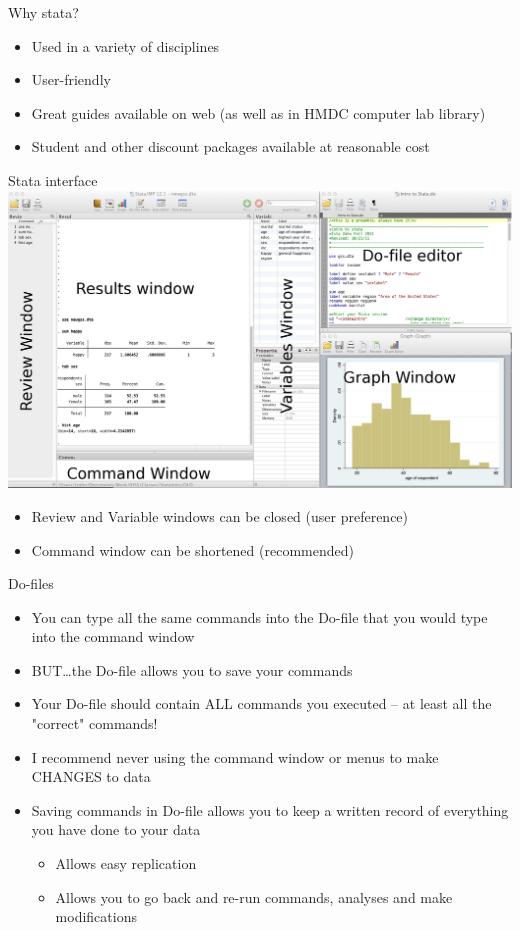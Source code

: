\documentclass[table,smaller]{beamer}
\begin{document}
\begin{frame}[label=sec-1-3]{Why stata?}
\begin{itemize}
\item Used in a variety of disciplines
\item User-friendly
\item Great guides available on web (as well as in HMDC computer lab library)
\item Student and other discount packages available at reasonable cost
\end{itemize}
\end{frame}
\begin{frame}[label=sec-1-4]{Stata interface}
\includegraphics[width=.9\linewidth]{images/StataInterface.png}

\begin{itemize}
\item Review and Variable windows can be closed (user preference)
\item Command window can be shortened (recommended)
\end{itemize}
\end{frame}
\begin{frame}[label=sec-1-5]{Do-files}
\begin{itemize}
\item You can type all the same commands into the Do-file that you would type into the command window
\item BUT\ldots{}the Do-file allows you to \alert{save} your commands
\item Your Do-file should contain ALL commands you executed -- at least all the "correct" commands!
\item I recommend never using the command window or menus to make CHANGES to data
\item Saving commands in Do-file allows you to keep a written record of everything you have done to your data
\begin{itemize}
\item Allows easy replication
\item Allows you to go back and re-run commands,  analyses and make modifications
\end{itemize}
\end{itemize}
\end{frame}
\end{document}
